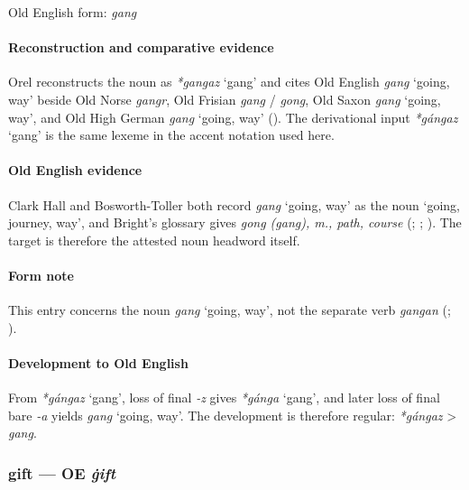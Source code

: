 \documentclass[
  british,
  a4paper,
]{article}
\providecommand{\Recon}[1]{\emph{*#1}}
\begin{document}
Old English form: \emph{gang}

\paragraph{Reconstruction and comparative
evidence}\label{reconstruction-and-comparative-evidence-22}

Orel reconstructs the noun as \Recon{gangaz} `gang' and cites Old
English {\emph{gang}} `going, way' beside Old Norse \emph{gangr}, Old
Frisian \emph{gang} / \emph{gong}, Old Saxon {\emph{gang}} `going, way',
and Old High German {\emph{gang}} `going, way'
(). The derivational input
\Recon{gángaz} `gang' is the same lexeme in the accent notation used
here.

\paragraph{Old English evidence}\label{old-english-evidence-22}

Clark Hall and Bosworth-Toller both record {\emph{gang}} `going, way' as
the noun `going, journey, way', and Bright's glossary gives \emph{gong
(gang), m., path, course} (; ;
). The target
is therefore the attested noun headword itself.

\paragraph{Form note}\label{form-note-3}

This entry concerns the noun {\emph{gang}} `going, way', not the
separate verb \emph{gangan} (; ).

\paragraph{Development to Old
English}\label{development-to-old-english-22}

From \Recon{gángaz} `gang', loss of final \emph{-z} gives \Recon{gánga}
`gang', and later loss of final bare \emph{-a} yields {\emph{gang}}
`going, way'. The development is therefore regular: \emph{*gángaz}
\textgreater{} \emph{gang}.

\subsubsection{\texorpdfstring{gift --- OE
\emph{ġift}}{gift --- OE ġift}}\label{gift-oe-ux121ift}
\end{document}
